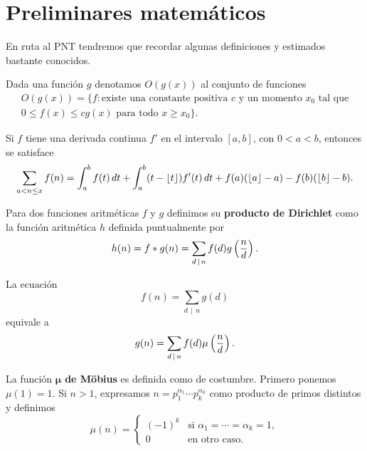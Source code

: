 \setlength{\headheight}{14.61858pt}
\pagestyle{fancy}

\chapter[Preliminares matem\'aticos]
{Preliminares matem\'aticos}
\label{ch:preliminaries}

En ruta al PNT
tendremos que recordar algunas definiciones y estimados bastante conocidos.

Dada una funci\'on \(g\) denotamos \(O(g(x))\) al conjunto de funciones
\[
  \begin{gathered}
    O(g(x)) = \{f : \text{existe una constante positiva } c \text{ y un momento } x_0 \text{ tal que} \\
    0 \leq f(x) \leq cg(x) \text{ para todo } x \geq x_0\}.
  \end{gathered}
\]

\begin{theorem}
\label{thm:euler}
Si \(f\) tiene una derivada continua \(f'\) en el intervalo \([a, b]\),
con \(0 < a < b\), entonces se satisface
\[
  \sum_{a < n \leq x} f(n) = \int_a^b f(t) \, dt +
  \int_a^b (t - \left\lfloor t \right\rfloor) f'(t) \, dt +
  f(a)(\left\lfloor a \right\rfloor - a) - f(b)(\left\lfloor b \right\rfloor - b).
\]
\end{theorem}

Para dos funciones aritm\'eticas \(f\) y \(g\)
definimos su \textbf{producto de Dirichlet} como la funci\'on aritm\'etica
\(h\) definida puntualmente por 
\[
  h(n)
  = f * g(n)
  = \sum_{d \, \mid \, n} f(d) g \left( \frac{n}{d} \right).
\]

\begin{theorem}
  \label{thm:mobius}
  La ecuaci\'on
  \[
    f(n) = \sum_{d \, \mid \, n} g(d)  
  \]
  equivale a
  \[
    g(n) = \sum_{d \, \mid \, n} f(d) \mu \left( \frac{n}{d} \right).
  \]
\end{theorem}

La funci\'on \(\boldsymbol{\mu}\) \textbf{de M\"{o}bius} es definida como de costumbre. 
Primero ponemos \(\mu(1) = 1\).
Si \(n > 1\), expresamos \(n = p_1^{\alpha_1} \cdots p_k^{\alpha_k}\)
como producto de primos distintos y definimos
\[
  \mu(n) = 
  \begin{cases}
    (-1)^k &\text{si } \alpha_1 = \cdots = \alpha_k = 1, \\
    0 &\text{en otro caso}. 
  \end{cases}
\]

